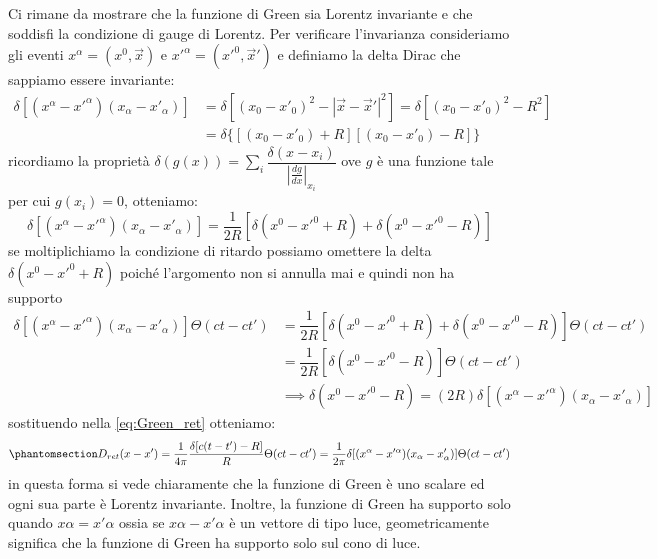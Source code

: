  Ci rimane da mostrare che la funzione di Green sia Lorentz invariante e che soddisfi la condizione di gauge di Lorentz. Per verificare l'invarianza consideriamo gli eventi $x^\alpha=(x^0,\Vec{x})$ e $x'^\alpha=(x'^0,\Vec{x}')$ e definiamo la delta Dirac che sappiamo essere invariante:
 \begin{equation}
 \begin{aligned}
      \delta[(x^\alpha-x'^\alpha)(x_\alpha-x'_\alpha)]&= \delta[(x_0-x'_0)^2-|\Vec{x}-\Vec{x}'|^2]= \delta[(x_0-x'_0)^2-R^2]\\
      &=\delta\{[(x_0-x'_0)+R][(x_0-x'_0)-R]\}
 \end{aligned}
 \end{equation}
 ricordiamo la proprietà $\delta(g(x))=\sum_i \dfrac{\delta(x-x_i)}{|\frac{dg}{dx}|_{x_i}}$ ove $g$ è una funzione tale per cui $g(x_i)=0$, otteniamo:
 \begin{equation}
     \delta[(x^\alpha-x'^\alpha)(x_\alpha-x'_\alpha)]= \dfrac{1}{2R}[\delta(x^0-x'^0+R)+\delta(x^0-x'^0-R)]
 \end{equation}
 se moltiplichiamo la condizione di ritardo possiamo omettere la delta $\delta(x^0-x'^0+R)$ poiché l'argomento non si annulla mai e quindi non ha supporto
  \begin{equation}
  \begin{aligned}
     \delta[(x^\alpha-x'^\alpha)(x_\alpha-x'_\alpha)]\Theta(ct-ct')&= \dfrac{1}{2R}[\delta(x^0-x'^0+R)+\delta(x^0-x'^0-R)]\Theta(ct-ct')\\
     &=\dfrac{1}{2R}[\delta(x^0-x'^0-R)]\Theta(ct-ct')\\
     &\implies \delta(x^0-x'^0-R)=(2R)\delta[(x^\alpha-x'^\alpha)(x_\alpha-x'_\alpha)]
  \end{aligned}
 \end{equation}
 sostituendo nella \eqref{eq:Green_ret} otteniamo:
 \begin{equation}\phantomsection\label{eq:Green_inva}
        D_{ret}(x-x')=\dfrac{1}{4\pi}\dfrac{\delta[c(t-t')-R]}{R}\Theta(ct-ct')=\dfrac{1}{2\pi}\delta[(x^\alpha-x'^\alpha)(x_\alpha-x'_\alpha)]\Theta(ct-ct')
\end{equation}
in questa forma si vede chiaramente che la funzione di Green è uno scalare ed ogni sua parte è Lorentz invariante. Inoltre, la funzione di Green ha supporto solo quando $x\alpha=x'\alpha$ ossia se $x\alpha-x'\alpha$ è un vettore di tipo luce, geometricamente significa che la funzione di Green ha supporto solo sul cono di luce.

